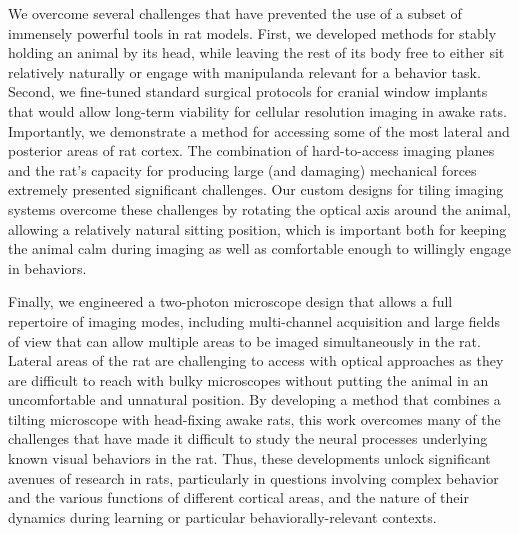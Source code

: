 We overcome several challenges that have prevented the use of a subset of immensely powerful tools in rat models. First, we developed methods for stably holding an animal by its head, while leaving the rest of its body free to either sit relatively naturally or engage with manipulanda relevant for a behavior task. Second, we fine-tuned standard surgical protocols for cranial window implants that would allow long-term viability for cellular resolution imaging in awake rats. Importantly, we demonstrate a method for accessing some of the most lateral and posterior areas of rat cortex. The combination of hard-to-access imaging planes and the rat's capacity for producing large (and damaging) mechanical forces extremely presented significant challenges. Our custom designs for tiling imaging systems overcome these challenges by rotating the optical axis around the animal, allowing a relatively natural sitting position, which is important both for keeping the animal calm during imaging as well as comfortable enough to willingly engage in behaviors. 

Finally, we engineered a two-photon microscope design that allows a full repertoire of imaging modes, including multi-channel acquisition and large fields of view that can allow multiple areas to be imaged simultaneously in the rat. Lateral areas of the rat are challenging to access with optical approaches as they are difficult to reach with bulky microscopes without putting the animal in an uncomfortable and unnatural position. By developing a method that combines a tilting microscope with head-fixing awake rats, this work overcomes many of the challenges that have made it difficult to study the neural processes underlying known visual behaviors in the rat. Thus, these developments unlock significant avenues of research in rats, particularly in questions involving complex behavior and the various functions of different cortical areas, and the nature of their dynamics during learning or particular behaviorally-relevant contexts. 





